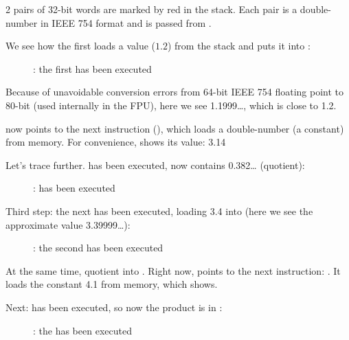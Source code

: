 ﻿\clearpage
{}
\myindex{\olly}

2 pairs of 32-bit words are marked by red in the stack. 
Each pair is a double-number in IEEE 754 format and is passed from \main.

We see how the first \FLD loads a value ($1.2$) from the stack and puts it into :

\begin{figure}[H]
\centering
{}
\caption{\olly: the first \FLD has been executed}
\label{fig:FPU_simple_olly_1}
\end{figure}

Because of unavoidable conversion errors from 64-bit IEEE 754 floating point to 80-bit
(used internally in the FPU), here we see 1.1999\ldots, which is close to 1.2.

\EIP now points to the next instruction (\FDIV), which loads a double-number (a constant) from memory.
For convenience, \olly shows its value: 3.14

\clearpage
Let's trace further. 
\FDIV has been executed, now  contains 0.382\ldots
(\gls{quotient}):

\begin{figure}[H]
\centering
{}
\caption{\olly: \FDIV has been executed}
\label{fig:FPU_simple_olly_2}
\end{figure}

\clearpage
Third step: the next \FLD 
has been executed, loading 3.4 into  (here we see the approximate value 3.39999\ldots): 

\begin{figure}[H]
\centering
{}
\caption{\olly: the second \FLD has been executed}
\label{fig:FPU_simple_olly_3}
\end{figure}

At the same time, \gls{quotient}  into .
Right now, \EIP points to the next instruction: \FMUL. 
It loads the constant 4.1 from memory, which \olly shows.

\clearpage
Next: \FMUL has been executed, so now the \gls{product} is in :

\begin{figure}[H]
\centering
{}
\caption{\olly: the \FMUL has been executed}
\label{fig:FPU_simple_olly_4}
\end{figure}

